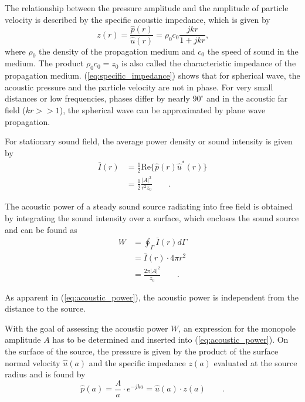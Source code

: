 The relationship between the pressure amplitude and the amplitude of particle velocity is described by the specific acoustic impedance, which is given by
\begin{equation}
	z(r) = \frac{\hat{p}(r)}{\hat{u}(r)} = \rho_0 c_0\frac{jkr}{1+jkr}\text{,} \label{eq:specific_impedance}
\end{equation}
where $\rho_0$ the density of the propagation medium and $c_0$ the speed of sound in the medium. The product $\rho_0 c_0 = z_0$ is also called the characteristic impedance of the propagation medium. (\ref{eq:specific_impedance}) shows that for spherical wave, the acoustic pressure and the particle velocity are not in phase. For very small distances or low frequencies, phases differ by nearly $90^{\circ}$ and in the acoustic far field ($kr >> 1$), the spherical wave can be approximated by plane wave propagation.

For stationary sound field, the average power density or sound intensity is given by
\begin{align}
	\bar{I}(r) &= \frac{1}{2}\text{Re}\lbrace\hat{p}(r)\hat{u}^*(r)\rbrace \\
	&=\frac{1}{2}\frac{|A|^2}{r^2z_0}\qquad \text{.}
\end{align}

The acoustic power of a steady sound source radiating into free field is obtained by integrating the sound intensity over a surface, which encloses the sound source and can be found as
\begin{align}
	W &= \oint_{\Gamma} \bar{I}(r) d\Gamma \\
	  &= \bar{I}(r)\cdot 4\pi r^2 \\
	  &= \frac{2\pi |A|^2}{z_0} \qquad \text{.} \label{eq:acoustic_power}
\end{align}

As apparent in (\ref{eq:acoustic_power}), the acoustic power is independent from the distance to the source.

With the goal of assessing the acoustic power $W$, an expression for the monopole amplitude $A$ has to be determined and inserted into (\ref{eq:acoustic_power}). On the surface of the source, the pressure is given by the product of the surface normal velocity $\hat{u}(a)$ and the specific impedance $z(a)$ evaluated at the source radius and is found by
\begin{equation}
	\hat{p}(a) = \frac{A}{a}\cdot e^{-jka} = \hat{u}(a)\cdot z(a) \qquad \text{.}
\end{equation}

